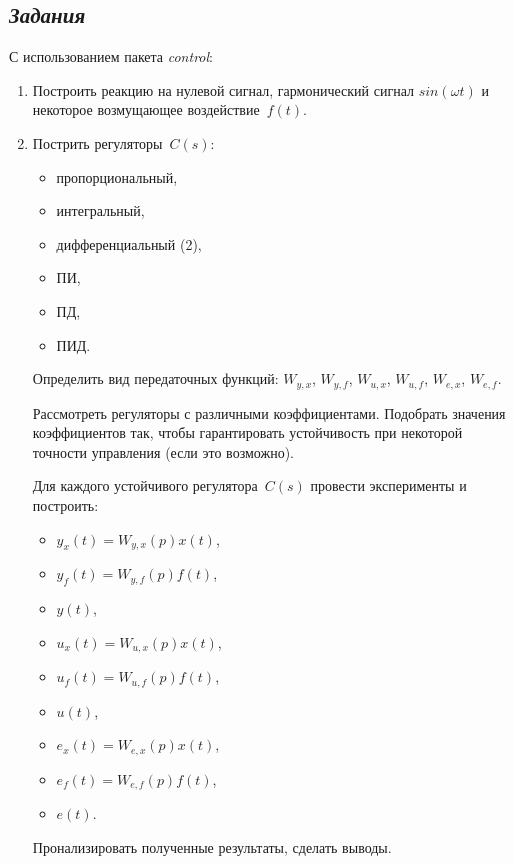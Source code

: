 \documentclass[a4paper,oneside,10pt]{book}
\theoremstyle{definition}
\begin{document}
	\subsection*{\textit{Задания}}
	С использованием пакета \textit{control}:
	\begin{enumerate}
		\item
		Построить реакцию на нулевой сигнал, гармонический сигнал $sin(\omega t)$ и некоторое возмущающее воздействие~$f(t)$. 
	\item
		Пострить регуляторы~$C(s)$: 
		\begin{itemize}
		    \item 
		    пропорциональный, 
		    \item 
		    интегральный, 
		    \item 
		    дифференциальный (2), 
		    \item 
		    ПИ,
		    \item
		    ПД, 
		    \item
		    ПИД. 
		\end{itemize}
		
		Определить вид передаточных функций: 
		$W_{y,x}$, $W_{y,f}$, 
		$W_{u,x}$, $W_{u,f}$,
		$W_{e,x}$, $W_{e,f}$.
		
		
		Рассмотреть регуляторы с различными коэффициентами. Подобрать значения коэффициентов так, чтобы гарантировать устойчивость при некоторой точности управления (если это возможно).  
		
		Для каждого устойчивого регулятора~$C(s)$ провести эксперименты и построить:
		\begin{itemize}
		    \item
		    $y_x(t) =  W_{y,x}(p)x(t)$, 
		    \item
		    $y_f(t) =  W_{y,f}(p)f(t)$, 
		    \item 
		    $y(t)$,
		    \item
		    $u_x(t) =  W_{u,x}(p)x(t)$, 
		    \item
		    $u_f(t) = W_{u,f}(p)f(t)$, 
		    \item
		    $u(t)$, 
		    \item
		    $e_x(t) =  W_{e,x}(p)x(t)$, 
		    \item
		    $e_f(t) = W_{e,f}(p)f(t)$, 
		    \item
		    $e(t)$.
		\end{itemize}
		
		Пронализировать полученные результаты, сделать выводы. 
	\end{enumerate}
	
	
	
\end{document}
